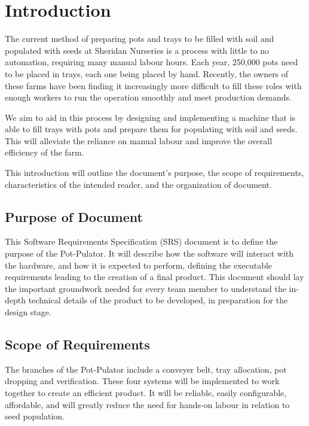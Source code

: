 \documentclass[12pt]{article}
\begin{document}
\newpage



\section{Introduction}

The current method of preparing pots and trays to be filled with soil and populated with seeds at Sheridan Nurseries is a process with little to no automation, requiring many manual labour hours. Each year, 250,000 pots need to be placed in trays, each one being placed by hand. Recently, the owners of these farms have been finding it increasingly more difficult to fill these roles with enough workers to run the operation smoothly and meet production demands. 

\noindent We aim to aid in this process by designing and implementing a machine that is able to fill trays with pots and prepare them for populating with soil and seeds. This will alleviate the reliance on manual labour and improve the overall efficiency of the farm. 

\noindent This introduction will outline the document’s purpose, the scope of requirements, characteristics of the intended reader, and the organization of document. 


\subsection{Purpose of Document}

This Software Requirements Specification (SRS) document is to define the purpose of the Pot-Pulator. It will describe how the software will interact with the hardware, and how it is expected to perform, defining the executable requirements leading to the creation of a final product. This document should lay the important groundwork needed for every team member to understand the in-depth technical details of the product to be developed, in preparation for the design stage. 

\subsection{Scope of Requirements} 

The branches of the Pot-Pulator include a conveyer belt, tray allocation, pot dropping and verification. These four systems will be implemented to work together to create an efficient product. It will be reliable, easily configurable, affordable, and will greatly reduce the need for hands-on labour in relation to seed population.  
\end{document}
